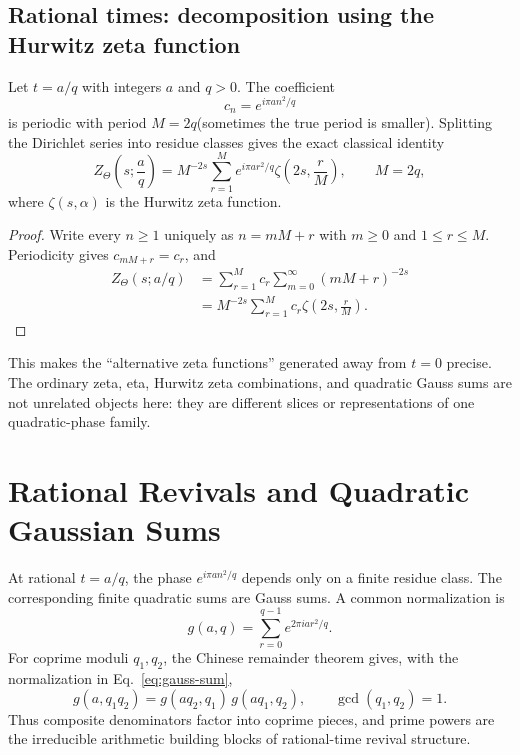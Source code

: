 \subsection{Rational times: decomposition using the Hurwitz zeta function}

Let $t=a/q$ with integers $a$ and $q>0$.  The coefficient
\begin{equation}
 c_n=e^{i\pi a n^2/q}
\end{equation}
is periodic with period $M=2q$(sometimes the true period is smaller).  Splitting the
Dirichlet series into residue classes gives the exact classical identity
\begin{equation}
 \boxed{
 Z_\Theta\!\left(s;\frac aq\right)
 =M^{-2s}\sum_{r=1}^{M}
 e^{i\pi a r^2/q}
 \zeta\!\left(2s,\frac rM\right),
 \qquad M=2q,}
 \label{eq:rational-hurwitz}
\end{equation}
where $\zeta(s,\alpha)$ is the Hurwitz zeta function.

\begin{proof}
Write every $n\ge1$ uniquely as $n=mM+r$ with $m\ge0$ and $1\le r\le M$.
Periodicity gives $c_{mM+r}=c_r$, and
\begin{align*}
 Z_\Theta(s;a/q)
 &=\sum_{r=1}^{M}c_r\sum_{m=0}^{\infty}(mM+r)^{-2s}\\
 &=M^{-2s}\sum_{r=1}^{M}c_r
   \zeta\!\left(2s,\frac rM\right).
\end{align*}
\end{proof}

This makes the ``alternative zeta functions'' generated away from $t=0$ precise.  The
ordinary zeta, eta, Hurwitz zeta combinations, and quadratic Gauss sums are not unrelated
objects here: they are different slices or representations of one quadratic-phase family.

\section{Rational Revivals and Quadratic Gaussian Sums}
\label{sec:gauss-revivals}

At rational $t=a/q$, the phase $e^{i\pi a n^2/q}$ depends only on a finite residue class.
The corresponding finite quadratic sums are Gauss sums.  A common normalization is
\begin{equation}
 g(a,q)=\sum_{r=0}^{q-1}e^{2\pi i a r^2/q}.
 \label{eq:gauss-sum}
\end{equation}
For coprime moduli $q_1,q_2$, the Chinese remainder theorem gives, with the
normalization in Eq.~\eqref{eq:gauss-sum},
\begin{equation}
 g(a,q_1q_2)=g(aq_2,q_1)\,g(aq_1,q_2),
 \qquad \gcd(q_1,q_2)=1.
 \label{eq:gauss-crt}
\end{equation}
Thus composite denominators factor into coprime pieces, and prime powers are the
irreducible arithmetic building blocks of rational-time revival structure.

